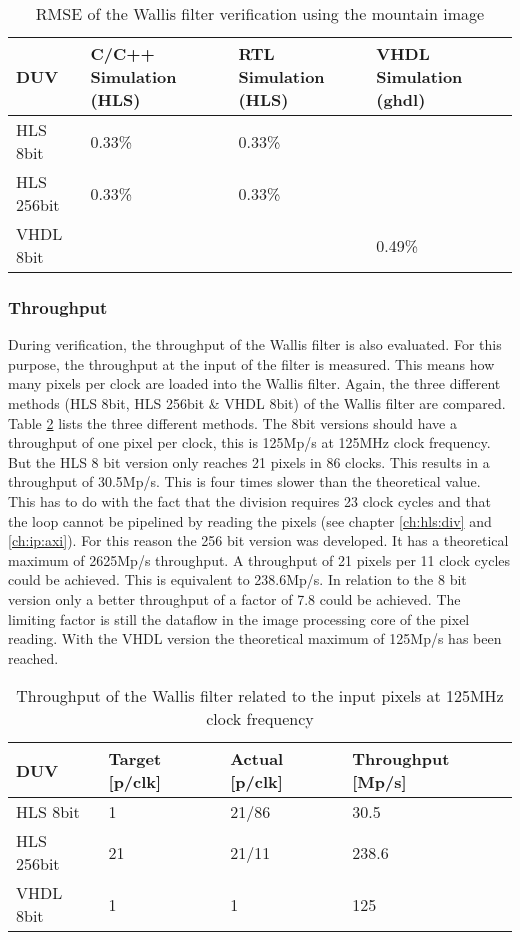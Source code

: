 \begin{table}[tb!]
    \centering
    \begin{tabular}{l l l l}
        \toprule
        DUV & C/C++ Simulation (HLS) & RTL Simulation (HLS) & VHDL Simulation (ghdl) \\
        \midrule
        HLS  8bit    & 0.33\%    & 0.33\%    & {} \\
        HLS  256bit  & 0.33\%    & 0.33\%    & {} \\
        VHDL 8bit        & {}         & {}         & 0.49\% \\
        \bottomrule
    \end{tabular}
    \caption{RMSE of the Wallis filter verification using the mountain image}
    \label{tab:rmse_mountain}
\end{table}

\subsubsection*{Throughput}
During verification, the throughput of the Wallis filter is also evaluated.
For this purpose, the throughput at the input of the filter is measured. This
means how many pixels per clock are loaded into the Wallis filter. Again, the
three different methods (HLS 8bit, HLS 256bit \& VHDL 8bit) of the Wallis filter
are compared. Table \ref{tab:throughput} lists the three different methods. The
8bit versions should have a throughput of one pixel per clock, this is 125Mp/s
at 125MHz clock frequency. But the HLS 8 bit version only reaches 21 pixels in
86 clocks. This results in a throughput of 30.5Mp/s. This is four times slower
than the theoretical value. This has to do with the fact that the division
requires 23 clock cycles and that the loop cannot be pipelined by reading the
pixels (see chapter \ref{ch:hls:div} and \ref{ch:ip:axi}). For this reason the
256 bit version was developed. It has a theoretical maximum of 2625Mp/s
throughput. A throughput of 21 pixels per 11 clock cycles could be achieved.
This
is equivalent to 238.6Mp/s. In relation to the 8 bit version only a better
throughput of a factor of 7.8 could be achieved. The limiting factor is still
the dataflow in the image processing core of the pixel reading. With the VHDL version the theoretical maximum of 125Mp/s has been
reached.

\begin{table}[tb!]
    \centering
    \begin{tabular}{l l l l}
        \toprule
        DUV & Target [p/clk] & Actual [p/clk]  & Throughput [Mp/s]\\
        \midrule
        HLS  8bit    & 1     & 21/86     & 30.5\\
        HLS  256bit  & 21    & 21/11     & 238.6 \\
        VHDL 8bit        & 1     & 1         & 125 \\
        \bottomrule
    \end{tabular}
    \caption{Throughput of the Wallis filter related to the input pixels at
    125MHz clock frequency}
    \label{tab:throughput}
\end{table}


